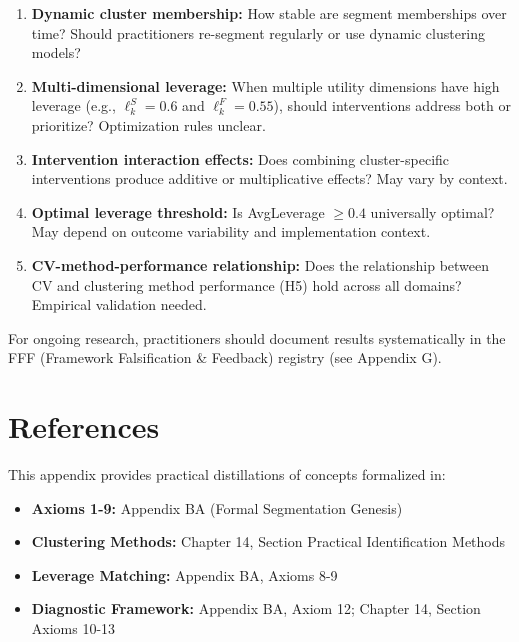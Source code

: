 \begin{enumerate}
\item \textbf{Dynamic cluster membership:} How stable are segment memberships over time? Should practitioners re-segment regularly or use dynamic clustering models?

\item \textbf{Multi-dimensional leverage:} When multiple utility dimensions have high leverage (e.g., $\ell_k^S = 0.6$ and $\ell_k^F = 0.55$), should interventions address both or prioritize? Optimization rules unclear.

\item \textbf{Intervention interaction effects:} Does combining cluster-specific interventions produce additive or multiplicative effects? May vary by context.

\item \textbf{Optimal leverage threshold:} Is AvgLeverage $\geq 0.4$ universally optimal? May depend on outcome variability and implementation context.

\item \textbf{CV-method-performance relationship:} Does the relationship between CV and clustering method performance (H5) hold across all domains? Empirical validation needed.
\end{enumerate}

For ongoing research, practitioners should document results systematically in the FFF (Framework Falsification \& Feedback) registry (see Appendix G).

\vspace{1em}


\section{References}
\label{sec:h-references}

This appendix provides practical distillations of concepts formalized in:

\begin{itemize}[nosep]
\item \textbf{Axioms 1-9:} Appendix BA (Formal Segmentation Genesis)
\item \textbf{Clustering Methods:} Chapter 14, Section Practical Identification Methods
\item \textbf{Leverage Matching:} Appendix BA, Axioms 8-9
\item \textbf{Diagnostic Framework:} Appendix BA, Axiom 12; Chapter 14, Section Axioms 10-13
\end{itemize}

